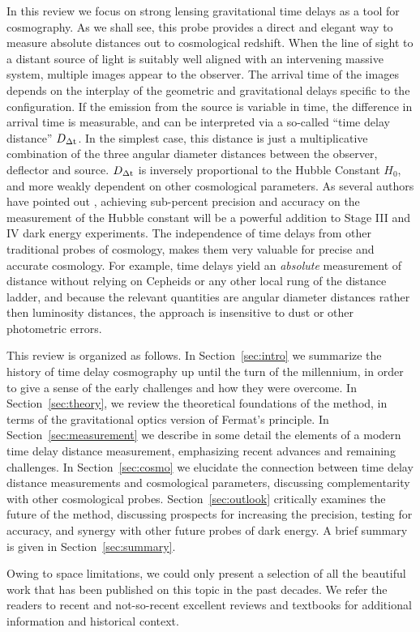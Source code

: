 In this review we focus on strong lensing gravitational time delays as
a tool for cosmography. As we shall see, this probe provides a direct
and elegant way to measure absolute distances out to cosmological
redshift. When the line of sight to a distant source of light is
suitably well aligned with an intervening massive system, multiple
images appear to the observer. The arrival time of the images depends
on the interplay of the geometric and gravitational delays specific to
the configuration. If the emission from the source is variable in
time, the difference in arrival time is measurable, and can be
interpreted via a so-called ``time delay distance'' $D_{\Delta{\rm t}}$.
In the simplest case, this distance is just a multiplicative combination
of the three angular diameter distances between the observer, deflector and
source. $D_{\Delta{\rm t}}$ is
inversely proportional to the Hubble Constant $H_0$, and more
weakly dependent on other cosmological parameters. As several authors
have pointed out \citep{Hu05,Lin11,Suy++12,Wei++13}, achieving
sub-percent precision and accuracy on the measurement of the Hubble
constant will be a powerful addition to Stage III and IV dark energy
experiments. The independence of time delays from other traditional
probes of cosmology, makes them very valuable for precise and accurate
cosmology. For example, time delays yield an {\it absolute}
measurement of distance without relying on Cepheids or any other local
rung of the distance ladder, and because the relevant quantities are
angular diameter distances rather then luminosity distances, the
approach is insensitive to dust or
other photometric errors.

This review is organized as follows. In Section~\ref{sec:intro} we
summarize the history of time delay cosmography up until the turn of
the millennium, in order to give a sense of the early challenges and
how they were overcome. In Section~\ref{sec:theory}, we review the
theoretical foundations of the method, in terms of the gravitational
optics version of Fermat's principle. In Section~\ref{sec:measurement}
we describe in some detail the elements of a modern time delay
distance measurement, emphasizing recent advances and remaining
challenges. In Section~\ref{sec:cosmo} we elucidate the connection
between time delay distance measurements and cosmological parameters,
discussing complementarity with other cosmological
probes. Section~\ref{sec:outlook} critically examines the future of
the method, discussing prospects for increasing the precision, testing
for accuracy, and synergy with other future probes of dark energy. A
brief summary is given in Section~\ref{sec:summary}.

Owing to space limitations, we could only present a selection of all
the beautiful work that has been published on this topic in the past
decades. We refer the readers to recent
\citep{Bar10,Ell10,Tre10,TMC12,Jackson:2013p30763,Jac15,T+E15}
and not-so-recent \citep{B+N92,CSS02,K+S04,Fal05,SKW06}
excellent reviews and textbooks \citep{SEF92} for additional
information and historical context.
